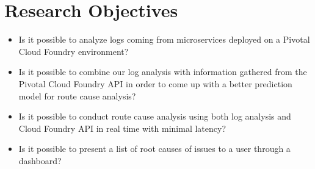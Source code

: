 \chapter{Research Objectives}

\begin{itemize}
  \item Is it possible to analyze logs coming from microservices deployed on a Pivotal Cloud Foundry environment?
  \item Is it possible to combine our log analysis with information gathered from the Pivotal Cloud Foundry API in order to come up with a better prediction model for route cause analysis?
  \item Is it possible to conduct route cause analysis using both log analysis and Cloud Foundry API in real time with minimal latency?
  \item Is it possible to present a list of root causes of issues to a user through a dashboard?
\end{itemize}